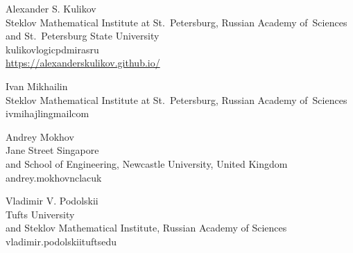 \documentclass{toc}
\begin{document}

% 



\begin{tocauthors}
\begin{tocinfo}[kulikov]
    Alexander S. Kulikov\\
    Steklov Mathematical Institute at St.~Petersburg,     Russian Academy of~Sciences\\ and St.~Petersburg State University\\
    kulikov\tocat{}logic\tocdot{}pdmi\tocdot{}ras\tocdot{}ru\\
    \url{https://alexanderskulikov.github.io/}
\end{tocinfo}
\begin{tocinfo}[mikhailin]
    Ivan Mikhailin\\
    Steklov Mathematical Institute at St.~Petersburg,     Russian Academy of~Sciences\\
    ivmihajlin\tocat{}gmail\tocdot{}com
\end{tocinfo}
\begin{tocinfo}[mokhov]
    Andrey Mokhov\\
    Jane Street Singapore\\
    and School of Engineering, Newcastle University, United Kingdom\\
    andrey.mokhov\tocat{}ncl\tocdot{}ac\tocdot{}uk
\end{tocinfo}
\begin{tocinfo}[podolskii]
    Vladimir V. Podolskii\\
    Tufts University\\
    and Steklov Mathematical Institute, Russian Academy of Sciences\\
    vladimir.podolskii\tocat{}tufts\tocdot{}edu\\
\end{tocinfo}
\end{tocauthors}
\end{document}
